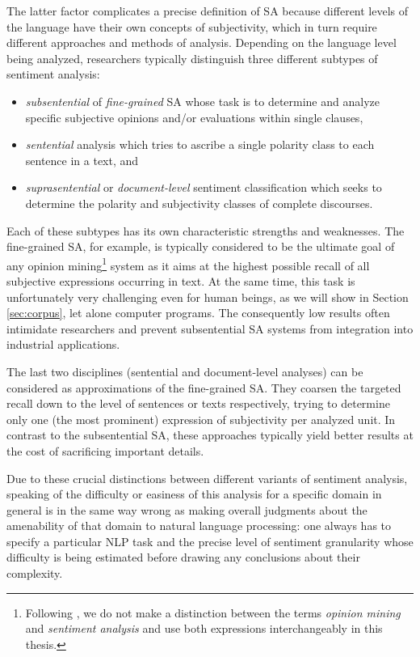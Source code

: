 The latter factor complicates a precise definition of SA because
different levels of the language have their own concepts of
subjectivity, which in turn require different approaches and methods
of analysis.  Depending on the language level being analyzed,
researchers typically distinguish three different subtypes of
sentiment analysis:
\begin{itemize}
  \item\emph{subsentential} of \emph{fine-grained} SA whose task is to
    determine and analyze specific subjective opinions and/or
    evaluations within single clauses,
  \item\emph{sentential} analysis which tries to ascribe a single
    polarity class to each sentence in a text, and
  \item\emph{suprasentential} or \emph{document-level} sentiment
    classification which seeks to determine the polarity and
    subjectivity classes of complete discourses.
\end{itemize}

Each of these subtypes has its own characteristic strengths and
weaknesses.  The fine-grained SA, for example, is typically considered
to be the ultimate goal of any opinion mining\footnote{Following
  \citet{Liu:12}, we do not make a distinction between the terms
  \emph{opinion mining} and \emph{sentiment analysis} and use both
  expressions interchangeably in this thesis.}  system as it aims at
the highest possible recall of all subjective expressions occurring in
text.  At the same time, this task is unfortunately very challenging
even for human beings, as we will show in Section \ref{sec:corpus},
let alone computer programs.  The consequently low results often
intimidate researchers and prevent subsentential SA systems from
integration into industrial applications.

The last two disciplines (sentential and document-level analyses) can
be considered as approximations of the fine-grained SA.  They coarsen
the targeted recall down to the level of sentences or texts
respectively, trying to determine only one (the most prominent)
expression of subjectivity per analyzed unit.  In contrast to the
subsentential SA, these approaches typically yield better results at
the cost of sacrificing important details.

Due to these crucial distinctions between different variants of
sentiment analysis, speaking of the difficulty or easiness of this
analysis for a specific domain in general is in the same way wrong as
making overall judgments about the amenability of that domain to
natural language processing: one always has to specify a particular
NLP task and the precise level of sentiment granularity whose
difficulty is being estimated before drawing any conclusions about
their complexity.

